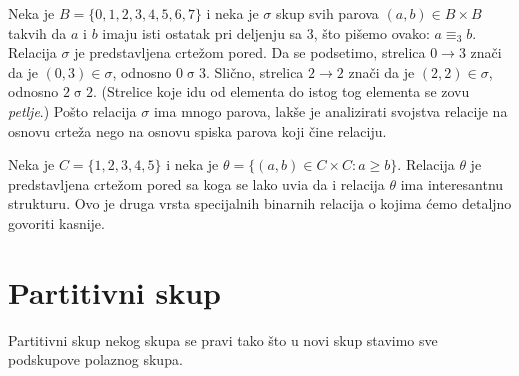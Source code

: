 \noindent
\begin{minipage}{3in}
  \begin{EX}\label{ft07.ex.02}
    Neka je $B = \{0, 1, 2, 3, 4, 5, 6, 7\}$ i neka je $\sigma$ skup svih parova $(a, b) \in B \times B$ takvih da
	$a$ i $b$ imaju isti ostatak pri deljenju sa 3, \v sto pi\v semo ovako: $a \equiv_3 b$.
    Relacija $\sigma$ je predstavljena crte\v zom pored. Da se podsetimo, strelica $0 \to 3$ zna\v ci da je
    $(0,3) \in \sigma$, odnosno $0 \mathrel\sigma 3$.
    Sli\v cno, strelica $2 \to 2$ zna\v ci da je $(2, 2) \in \sigma$, odnosno $2 \mathrel\sigma 2$. (Strelice koje
    idu od elementa do istog tog elementa se zovu \emph{petlje}.) Po\v sto relacija $\sigma$ ima
    mnogo parova, lak\v se je analizirati svojstva relacije na osnovu crte\v za nego na osnovu spiska parova koji \v cine
    relaciju.
  \end{EX}
\end{minipage}
\hfill
\begin{minipage}{2.5in}
  \begin{center}
    
  \end{center}
\end{minipage}

\medskip

\noindent
\begin{minipage}{3in}
  \begin{EX}\label{ft07.ex.03}
    Neka je $C = \{1, 2, 3, 4, 5\}$ i neka je $\theta = \{(a, b) \in C \times C : a \ge b\}$.
    Relacija $\theta$ je predstavljena crte\v zom pored sa koga se lako uvi\dj a
    da i relacija $\theta$ ima interesantnu strukturu. Ovo je druga vrsta specijalnih binarnih
    relacija o kojima \'cemo detaljno govoriti kasnije.
  \end{EX}
\end{minipage}
\hfill
\begin{minipage}{2.5in}
  \begin{center}
    
  \end{center}
\end{minipage}




\section{Partitivni skup}

Partitivni skup nekog skupa se pravi tako \v sto u novi skup stavimo sve podskupove polaznog skupa.

